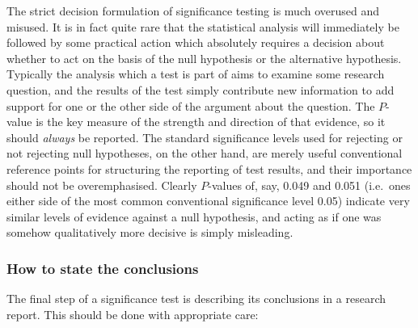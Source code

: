 \documentclass[11pt,a4paper,openany]{book}
\begin{document}
The strict decision formulation of significance testing is much overused
and misused. It is in fact quite rare that the statistical analysis will
immediately be followed by some practical action which absolutely
requires a decision about whether to act on the basis of the null
hypothesis or the alternative hypothesis. Typically the analysis which a
test is part of aims to examine some research question, and the results
of the test simply contribute new information to add support for one or
the other side of the argument about the question. The \(P\)-value is
the key measure of the strength and direction of that evidence, so it
should \emph{always} be reported. The standard significance levels used
for rejecting or not rejecting null hypotheses, on the other hand, are
merely useful conventional reference points for structuring the
reporting of test results, and their importance should not be
overemphasised. Clearly \(P\)-values of, say, 0.049 and 0.051 (i.e.~ones
either side of the most common conventional significance level 0.05)
indicate very similar levels of evidence against a null hypothesis, and
acting as if one was somehow qualitatively more decisive is simply
misleading.

\subsubsection*{How to state the
conclusions}\label{how-to-state-the-conclusions}

The final step of a significance test is describing its conclusions in a
research report. This should be done with appropriate care:
\end{document}
